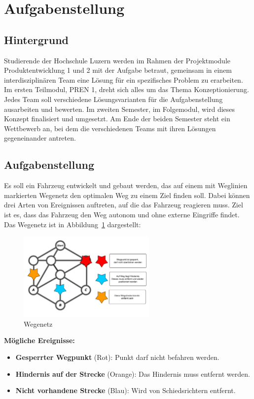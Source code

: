 \documentclass[../main.tex]{subfiles}
\begin{document}
\section{Aufgabenstellung}

\subsection{Hintergrund}

Studierende der Hochschule Luzern werden im Rahmen der Projektmodule
Produktentwicklung 1 und 2 mit der Aufgabe betraut, gemeinsam in einem
interdisziplinären Team eine Lösung für ein spezifisches Problem zu erarbeiten.
Im ersten Teilmodul, PREN 1, dreht sich alles um das Thema Konzeptionierung.
Jedes Team soll verschiedene Lösungsvarianten für die Aufgabenstellung
ausarbeiten und bewerten. Im zweiten Semester, im Folgemodul, wird dieses
Konzept finalisiert und umgesetzt. Am Ende der beiden Semester steht ein
Wettbewerb an, bei dem die verschiedenen Teams mit ihren Lösungen gegeneinander
antreten.

\subsection{Aufgabenstellung}

Es soll ein Fahrzeug entwickelt und gebaut werden, das auf einem mit Weglinien
markierten Wegenetz den optimalen Weg zu einem Ziel finden soll. Dabei können
drei Arten von Ereignissen auftreten, auf die das Fahrzeug reagieren muss. Ziel
ist es, dass das Fahrzeug den Weg autonom und ohne externe Eingriffe findet.
Das Wegenetz ist in Abbildung~\ref{fig:wegenetz} dargestellt:

\begin{figure}[h!]
    \centering
    \includegraphics[width=0.6\textwidth]{./resources/Abbildung_Wegenetz.pdf}
    \caption{Wegenetz}
    \label{fig:wegenetz}
\end{figure}

\textbf{Mögliche Ereignisse:}
\begin{itemize}
    \item \textbf{Gesperrter Wegpunkt} (Rot): Punkt darf nicht befahren werden.
    \item \textbf{Hindernis auf der Strecke} (Orange): Das Hindernis muss entfernt werden.
    \item \textbf{Nicht vorhandene Strecke} (Blau): Wird von Schiedsrichtern entfernt.
\end{itemize}
\end{document}
